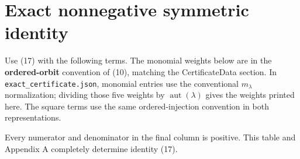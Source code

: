 \documentclass[11pt]{article}
\begin{document}
\clearpage

\hypertarget{appendix-b.-exact-nonnegative-symmetric-identity}{%
\section{Exact nonnegative symmetric identity}\label{appendix-b.-exact-nonnegative-symmetric-identity}}

Use (17) with the following terms. The monomial weights below are in the
\textbf{ordered-orbit} convention of (10), matching the CertificateData
section. In \texttt{exact\_certificate.json}, monomial entries use the
conventional \(m_\lambda\) normalization; dividing those five weights by
\(\operatorname{aut}(\lambda)\) gives the weights printed here. The
square terms use the same ordered-injection convention in both
representations.

Every numerator and denominator in the final column is positive. This
table and Appendix A completely determine identity (17).
\end{document}
